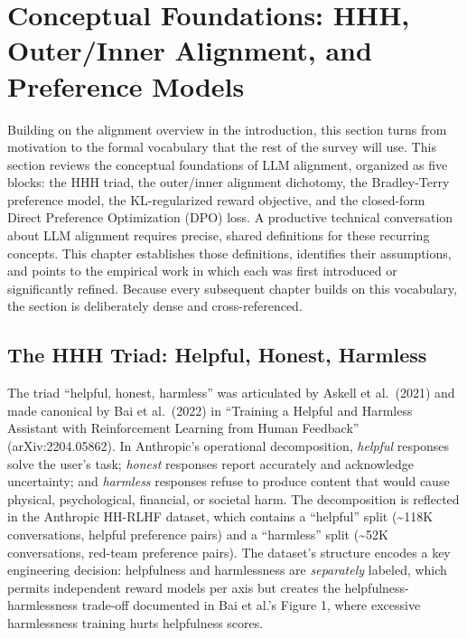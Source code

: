 \documentclass{article}
\begin{document}
\section{Conceptual Foundations: HHH, Outer/Inner Alignment, and Preference Models}\label{conceptual-foundations-hhh-outerinner-alignment-and-preference-models}

Building on the alignment overview in the introduction, this section turns from motivation to the formal vocabulary that the rest of the survey will use. This section reviews the conceptual foundations of LLM alignment, organized as five blocks: the HHH triad, the outer/inner alignment dichotomy, the Bradley-Terry preference model, the KL-regularized reward objective, and the closed-form Direct Preference Optimization (DPO) loss. A productive technical conversation about LLM alignment requires precise, shared definitions for these recurring concepts. This chapter establishes those definitions, identifies their assumptions, and points to the empirical work in which each was first introduced or significantly refined. Because every subsequent chapter builds on this vocabulary, the section is deliberately dense and cross-referenced.

\subsection{The HHH Triad: Helpful, Honest, Harmless}\label{the-hhh-triad-helpful-honest-harmless}

The triad ``helpful, honest, harmless'' was articulated by Askell et al.~(2021) and made canonical by Bai et al.~(2022) in ``Training a Helpful and Harmless Assistant with Reinforcement Learning from Human Feedback'' (arXiv:2204.05862). In Anthropic's operational decomposition, \emph{helpful} responses solve the user's task; \emph{honest} responses report accurately and acknowledge uncertainty; and \emph{harmless} responses refuse to produce content that would cause physical, psychological, financial, or societal harm. The decomposition is reflected in the Anthropic HH-RLHF dataset, which contains a ``helpful'' split (\textasciitilde118K conversations, helpful preference pairs) and a ``harmless'' split (\textasciitilde52K conversations, red-team preference pairs). The dataset's structure encodes a key engineering decision: helpfulness and harmlessness are \emph{separately} labeled, which permits independent reward models per axis but creates the helpfulness-harmlessness trade-off documented in Bai et al.'s Figure 1, where excessive harmlessness training hurts helpfulness scores.
\end{document}
